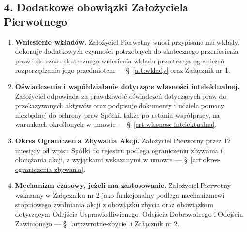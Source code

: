 \documentclass[12pt,a4paper]{report}
\begin{document}
\subsection*{4. Dodatkowe obowiązki Założyciela Pierwotnego}
\begin{enumerate}
  \item \textbf{Wniesienie wkładów.} Założyciel Pierwotny wnosi przypisane mu wkłady, dokonuje dodatkowych czynności potrzebnych do skutecznego przeniesienia praw i do czasu skutecznego wniesienia wkładu przestrzega ograniczeń rozporządzania jego przedmiotem — §~\ref{art:wklady} oraz Załącznik nr 1.
  \item \textbf{Oświadczenia i współdziałanie dotyczące własności intelektualnej.} Założyciel odpowiada za prawdziwość oświadczeń dotyczących praw do przekazywanych aktywów oraz podpisuje dokumenty i udziela pomocy niezbędnej do ochrony praw Spółki, także po ustaniu współpracy, na warunkach określonych w umowie — §~\ref{art:wlasnosc-intelektualna}.
  \item \textbf{Okres Ograniczenia Zbywania Akcji.} Założyciel Pierwotny przez 12 miesięcy od wpisu Spółki do rejestru podlega ograniczeniu zbywania i obciążania akcji, z wyjątkami wskazanymi w umowie — §~\ref{art:okres-ograniczenia-zbywania}.
  \item \textbf{Mechanizm czasowy, jeżeli ma zastosowanie.} Założyciel Pierwotny wskazany w Załączniku nr 2 jako funkcjonalny podlega mechanizmowi stopniowego zwalniania akcji z obowiązku zbycia oraz obowiązkom dotyczącym Odejścia Usprawiedliwionego, Odejścia Dobrowolnego i Odejścia Zawinionego — §~\ref{art:zwrotne-zbycie} i Załącznik nr 2.
\end{enumerate}
\end{document}
